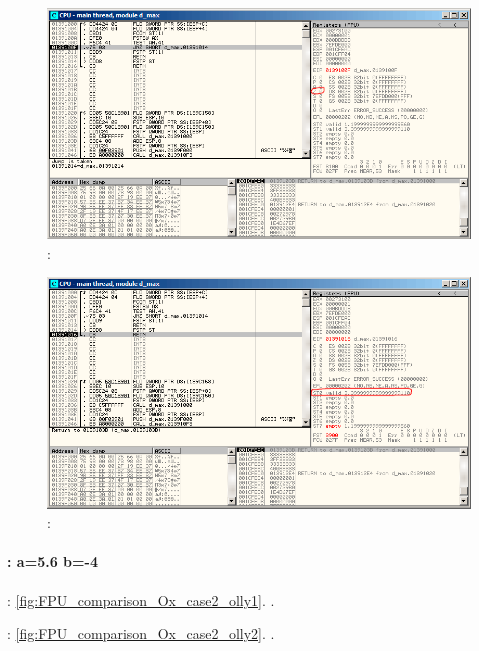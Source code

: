 \begin{figure}[H]
\centering
\includegraphics[scale=\FigScale]{patterns/12_FPU/3_comparison/x86/MSVC_Ox/olly1_4.png}
\caption{\olly: \TEST {}}
\label{fig:FPU_comparison_Ox_case1_olly4}
\end{figure}

\begin{figure}[H]
\centering
\includegraphics[scale=\FigScale]{patterns/12_FPU/3_comparison/x86/MSVC_Ox/olly1_5.png}
\caption{\olly: \FSTP {}}
\label{fig:FPU_comparison_Ox_case1_olly5}
\end{figure}

\paragraph{: a=5.6 \AndENRU b=-4}

 \FLD {}: \ref{fig:FPU_comparison_Ox_case2_olly1}.
\FCOMP{}.

\FCOM {}: \ref{fig:FPU_comparison_Ox_case2_olly2}.
.

